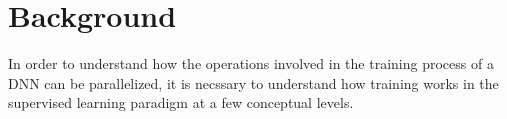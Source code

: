 \documentclass[11pt,a4paper]{article}
\begin{document}



\section{Background} \label{background}
In order to understand how the operations involved in the training process of a DNN can be parallelized, it is necssary to understand how training works in the supervised learning paradigm at a few conceptual levels. 
\end{document}
